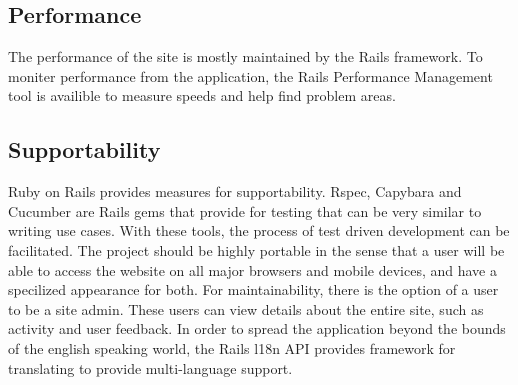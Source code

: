 \subsection{Performance}
The performance of the site is mostly maintained by the Rails framework. To moniter performance from the application, the Rails Performance Management tool is availible to measure speeds and help find problem areas.


\subsection{Supportability}
Ruby on Rails provides measures for supportability. Rspec, Capybara and Cucumber are Rails gems that provide for testing that can be very similar to writing use cases. With these tools, the process of test driven development can be facilitated. 
The project should be highly portable in the sense that a user will be able to access the website on all major browsers and mobile devices, and have a specilized appearance for both. 
For maintainability, there is the option of a user to be a site admin. These users can view details about the entire site, such as activity and user feedback. 
In order to spread the application beyond the bounds of the english speaking world, the Rails l18n API provides framework for translating to provide multi-language support.
